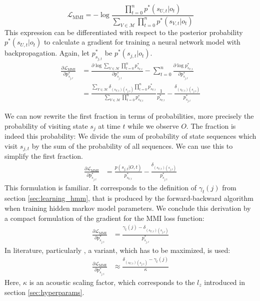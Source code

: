 \[
\mathcal{L}_{\text{MMI}} = -\log\frac{\prod_{t = 0}^{n} p^*(s_{U,t}|o_{t})}{\sum_{V \in \mathcal{M}} \prod_{t = 0}^{n} p^*(s_{V,t}|o_{t})} 
\]
This expression can be differentiated with respect to the posterior probability $p^*(s_{U,t}|o_{t})$ to calculate a gradient for training a neural network model with backpropagation. Again, let $p^*_{s_{j,t}}$ be $p^*(s_{j,t}|o_t)$.
\begin{align*}
\frac{\partial\mathcal{L}_{\text{MMI}}}{\partial p^*_{s_{j,t}}} &= \frac{\partial \log \sum_{V \in \mathcal{M}} \prod_{t = 0}^{n} p^*_{s_{V,t}}}{\partial p^*_{s_{j,t}}} - \sum_{t = 0}^{n} \frac{\partial \log p^*_{s_{U,t}}}{\partial p^*_{s_{j,t}}} \\
&= \frac{ \sum_{V \in \mathcal{M}} \delta_{(s_{V,t})(s_{j,t})} \prod_{t = 0}^{n} p^*_{s_{V,t}}}{\sum_{V \in \mathcal{M}} \prod_{t = 0}^{n} p^*_{s_{V,t}}}\frac{1}{p^*_{s_{V,t}}} - \frac{\delta_{(s_{U,t})(s_{j,t})}}{p^*_{s_{j,t}}}
\end{align*}

We can now rewrite the first fraction in terms of probabilities, more precisely the probability of visiting state $s_{j}$ at time $t$ while we observe $O$. The fraction is indeed this probability: We divide the sum of probability of state sequences which visit $s_{j,t}$ by the sum of the probability of all sequences. We can use this to simplify the first fraction.
\begin{align*}
\frac{\partial\mathcal{L}_{\text{MMI}}}{\partial p^*_{s_{j,t}}} &= \frac{p(s_{j,t}|O, t)}{p^*_{s_{V,t}}} - \frac{\delta_{(s_{U,t})(s_{j,t})}}{p^*_{s_{j,t}}}
\end{align*}
This formulation is familiar. It corresponds to the definition of $\gamma_t(j)$ from section \ref{sec:learning_hmm}, that is produced by the forward-backward algorithm when training hidden markov model parameters. We conclude this derivation by a compact formulation of the gradient for the MMI loss function:
\begin{align}
\label{eq:mmi_grad}
\frac{\partial\mathcal{L}_{\text{MMI}}}{\partial p^*_{s_{j,t}}} &=  \frac{\gamma_t(j) -\delta_{(s_{U,t})(s_{j,t})}}{p^*_{s_{j,t}}}
\end{align} 
In literature, particularly \cite{ghoshal2013sequence}, a variant, which has to be maximized, is used: 
\begin{align}
\label{eq:mmi_grad_simple}
\frac{\partial\mathcal{L}_{\text{MMI}}}{\partial p^*_{s_{j,t}}} &\approx \frac{\delta_{(s_{U,t})(s_{j,t})} - \gamma_t(j)}{\kappa}
\end{align}
Here, $\kappa$ is an acoustic scaling factor, which corresponds to the $l_z$ introduced in section \ref{sec:hyperparams}.

